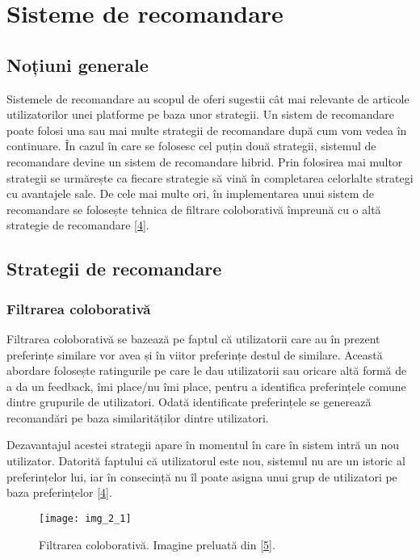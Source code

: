 \section{Sisteme de recomandare}

\subsection{Noțiuni generale}

Sistemele de recomandare au scopul de oferi sugestii cât mai relevante de articole utilizatorilor unei platforme pe baza unor strategii. Un sistem de recomandare poate folosi una sau mai multe strategii de recomandare după cum vom vedea în continuare. În cazul în care se folosesc cel puțin două strategii, sistemul de recomandare devine un sistem de recomandare hibrid. Prin folosirea mai multor strategii se urmărește ca fiecare strategie să vină în completarea celorlalte strategi cu avantajele sale. De cele mai multe ori, în implementarea unui sistem de recomandare se folosește tehnica de filtrare coloborativă împreună cu o altă strategie de recomandare \hyperlink{ErionCanoMaurizioMorisio}{[4]}.

\subsection{Strategii de recomandare}

\subsubsection*{Filtrarea coloborativă}

Filtrarea coloborativă se bazează pe faptul că utilizatorii care au în prezent preferințe similare vor avea și în viitor preferințe destul de similare. Această abordare folosește ratingurile pe care le dau utilizatorii sau oricare altă formă de a da un feedback, îmi place/nu îmi place, pentru a identifica preferințele comune dintre grupurile de utilizatori. Odată identificate preferințele se generează recomandări pe baza similarităților dintre utilizatori. 

Dezavantajul acestei strategii apare în momentul în care în sistem intră un nou utilizator. Datorită faptului că utilizatorul este nou, sistemul nu are un istoric al preferințelor lui, iar în consecință nu îl poate asigna unui grup de utilizatori pe baza preferințelor \hyperlink{ErionCanoMaurizioMorisio}{[4]}.
\begin{figure}[!h]
	\centering
	\texttt{[image: img\_2\_1]}
	\caption[Filtrarea coloborativă]{Filtrarea coloborativă. Imagine preluată din \hyperlink{datameetsmedia}{[5]}.}
\end{figure} 

